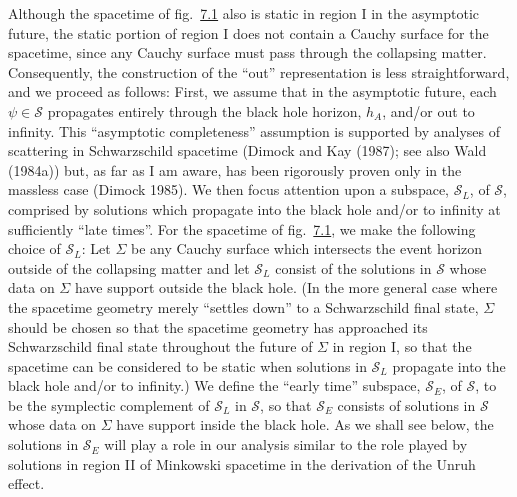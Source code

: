 \documentclass[11pt,a4paper]{article}
\begin{document}
Although the spacetime of fig.~\hyperref[fig:7.1]{7.1} also is static in region I in the asymptotic future, the static portion of region I does not contain a Cauchy surface for the spacetime, since any Cauchy surface must pass through the collapsing matter. Consequently, the construction of the ``out'' representation is less straightforward, and we proceed as follows: First, we assume that in the asymptotic future, each \(\psi \in \mathcal{S}\) propagates entirely through the black hole horizon, \(h_A\), and/or out to infinity. This ``asymptotic completeness'' assumption is supported by analyses of scattering in Schwarzschild spacetime (Dimock and Kay (1987); see also Wald (1984a)) but, as far as I am aware, has been rigorously proven only in the massless case (Dimock 1985). We then focus attention upon a subspace, \(\mathcal{S}_{L}\), of \(\mathcal{S}\), comprised by solutions which propagate into the black hole and/or to infinity at sufficiently ``late times''. For the spacetime of fig.~\hyperref[fig:7.1]{7.1}, we make the following choice of \(\mathcal{S}_{L}\): Let \(\Sigma\) be any Cauchy surface which intersects the event horizon outside of the collapsing matter and let \(\mathcal{S}_{L}\) consist of the solutions in \(\mathcal{S}\) whose data on \(\Sigma\) have support outside the black hole. (In the more general case where the spacetime geometry merely ``settles down'' to a Schwarzschild final state, \(\Sigma\) should be chosen so that the spacetime geometry has approached its Schwarzschild final state throughout the future of \(\Sigma\) in region I, so that the spacetime can be considered to be static when solutions in \(\mathcal S_L\) propagate into the black hole and/or to infinity.) We define the ``early time'' subspace, \(\mathcal{S}_{E}\), of \(\mathcal{S}\), to be the symplectic complement of \(\mathcal S_L\) in \(\mathcal S\), so that \(\mathcal S_E\) consists of solutions in \(\mathcal S\) whose data on \(\Sigma\) have support inside the black hole. As we shall see below, the solutions in \(\mathcal S_E\) will play a role in our analysis similar to the role played by solutions in region II of Minkowski spacetime in the derivation of the Unruh effect.
\end{document}
